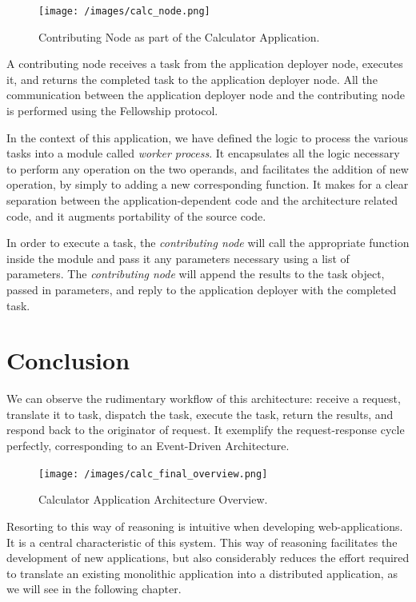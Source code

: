 \documentclass[12pt, titlepage]{uo_temp}
\begin{document}
     \begin{figure}
       \texttt{[image: /images/calc\_node.png]}
       \caption{Contributing Node as part of the Calculator Application.}
     \end{figure}
     A contributing node receives a task from the application deployer node, executes it,
     and returns the completed task to the application deployer node. All the
     communication between the application deployer node and the contributing node is
     performed using the Fellowship protocol.

     In the context of this application, we have defined the logic to process the various
     tasks into a module called \emph{worker process}. It encapsulates all the logic
     necessary to perform any operation on the two operands, and facilitates the addition
     of new operation, by simply to adding a new corresponding function. It makes for a
     clear separation between the application-dependent code and the architecture related
     code, and it augments portability of the source code.

     In order to execute a task, the \emph{contributing node} will call the appropriate
     function inside the module and pass it any parameters necessary using a list of
     parameters. The \emph{contributing node} will append the results to the task object,
     passed in parameters, and reply to the application deployer with the completed task.
         
     \section{Conclusion}
     We can observe the rudimentary workflow of this architecture: receive a request,
     translate it to task, dispatch the task, execute the task, return the results, and
     respond back to the originator of request. It exemplify the request-response cycle
     perfectly, corresponding to an Event-Driven Architecture.
     
     \begin{figure}[h]
       \texttt{[image: /images/calc\_final\_overview.png]}
       \caption{Calculator Application Architecture Overview.}
     \end{figure}
     
     Resorting to this way of reasoning is intuitive when developing web-applications. It
     is a central characteristic of this system. This way of reasoning facilitates the
     development of new applications, but also considerably reduces the effort required to
     translate an existing monolithic application into a distributed application, as we
     will see in the following chapter.
     
\end{document}
